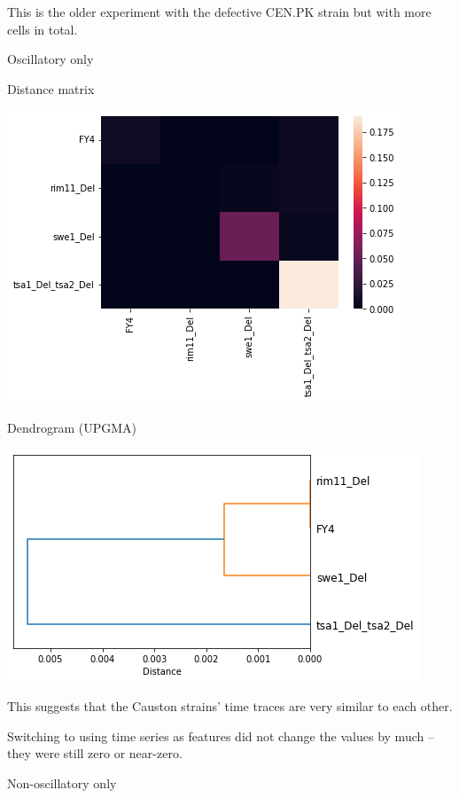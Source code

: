 This is the older experiment with the defective CEN.PK strain but with more cells in total.

Oscillatory only
\label{sec:org468bf6f}

Distance matrix

\begin{center}
\includegraphics[width=.9\linewidth]{MIHierClust_19979_osc_distmatrix.png}
\end{center}

Dendrogram (UPGMA)

\begin{center}
\includegraphics[width=.9\linewidth]{MIHierClust_19979_osc_dendrogram.png}
\end{center}

This suggests that the Causton strains' time traces are very similar to each other.

Switching to using time series as features did not change the values by much -- they were still zero or near-zero.

Non-oscillatory only
\label{sec:org0984c97}

